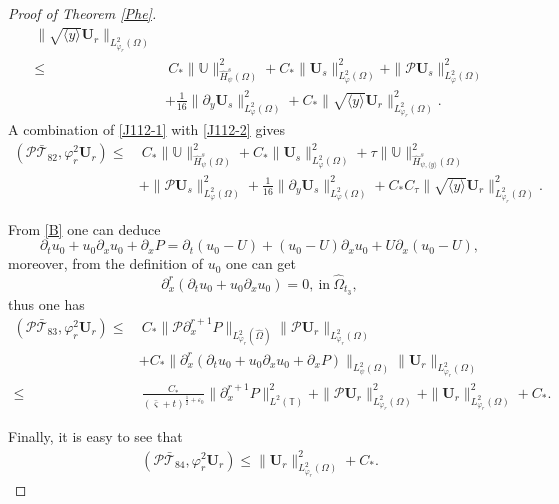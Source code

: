 \documentclass[10pt,a4paper]{amsart}
\newcommand\y{{{\langle y \rangle}}}
\begin{document}
\begin{proof}[Proof of Theorem \ref{Phe}]
\begin{align}
        \|\sqrt{\y}\mathbf{U}_{r}\|_{L_{\varphi_{r}}^{2}(\Omega)}\nonumber\\
\leq&~C_{*}\|\mathbb{U}\|_{\hat{H}_{\psi}^{s}(\Omega)}^{2}
     +C_{*}\|\mathbf{U}_{s}\|_{L_{\varphi}^{2}(\Omega)}^{2}
     +\|\mathcal{P}\mathbf{U}_{s}\|_{L_{\varphi}^{2}(\Omega)}^{2}\nonumber\\
    &+\frac{1}{16}\|\partial_{y}\mathbf{U}_{s}\|_{L_{\varphi}^{2}(\Omega)}^{2}
     +C_{*}\|\sqrt{\y}\mathbf{U}_{r}\|_{L_{\varphi_{r}}^{2}(\Omega)}^{2}.\nonumber
\end{align}
A combination of \eqref{J112-1} with \eqref{J112-2} gives
\begin{align}\label{J112}
(\mathcal{P}\bar{\mathcal{T}}_{82},\varphi_{r}^{2}\mathbf{U}_{r})
\leq&~C_{*}\|\mathbb{U}\|_{\hat{H}_{\psi}^{s}(\Omega)}^{2}
     +C_{*}\|\mathbf{U}_{s}\|_{L_{\varphi}^{2}(\Omega)}^{2}
     +\tau\|\mathbb{U}\|_{\hat{H}_{\psi,\y}^{s}(\Omega)}^{2}\\
    &+\|\mathcal{P}\mathbf{U}_{s}\|_{L_{\varphi}^{2}(\Omega)}^{2}
     +\frac{1}{16}\|\partial_{y}\mathbf{U}_{s}\|_{L_{\varphi}^{2}(\Omega)}^{2}
     +C_{*}C_{\tau}\|\sqrt{\y}\mathbf{U}_{r}\|_{L_{\varphi_{r}}^{2}(\Omega)}^{2}.\nonumber
\end{align}

From \eqref{B} one can deduce
$$\partial_{t}u_{0}+u_{0}\partial_{x}u_{0}+\partial_{x}P=\partial_{t}(u_{0}-U)+(u_{0}-U)\partial_{x}u_{0}+U\partial_{x}(u_{0}-U),$$
moreover, from the definition of $u_{0}$ one can get
$$\partial_{x}^{r}(\partial_{t}u_{0}+u_{0}\partial_{x}u_{0})=0,~\text{in}~\hat{\Omega}_{t_{3}},$$
thus one has
\begin{align}\label{J113}
(\mathcal{P}\bar{\mathcal{T}}_{83},\varphi_{r}^{2}\mathbf{U}_{r})
\leq&~C_{*}\|\mathcal{P}\partial_{x}^{r+1}P\|_{L_{\varphi_{r}}^{2}(\hat{\Omega})}\|\mathcal{P}\mathbf{U}_{r}\|_{L_{\varphi_{r}}^{2}(\Omega)}\\
    &+C_{*}\|\partial_{x}^{r}(\partial_{t}u_{0}+u_{0}\partial_{x}u_{0}+\partial_{x}P)\|_{L_{\psi}^{2}(\Omega)}\|\mathbf{U}_{r}\|_{L_{\varphi_{r}}^{2}(\Omega)}\nonumber\\
\leq&~\frac{C_{*}}{(\bar{\varsigma}+t)^{\frac{1}{2}+\varepsilon_{0}}}\|\partial_{x}^{r+1}P\|_{L^{2}(\mathbb{T})}^{2}
     +\|\mathcal{P}\mathbf{U}_{r}\|_{L_{\varphi_{r}}^{2}(\Omega)}^{2}
     +\|\mathbf{U}_{r}\|_{L_{\varphi_{r}}^{2}(\Omega)}^{2}
     +C_{*}.\nonumber
\end{align}

Finally, it is easy to see that
\begin{align}\label{J114}
(\mathcal{P}\bar{\mathcal{T}}_{84},\varphi_{r}^{2}\mathbf{U}_{r})
\leq \|\mathbf{U}_{r}\|_{L_{\varphi_{r}}^{2}(\Omega)}^{2}
    +C_{*}.
\end{align}


\end{proof}
\end{document}

